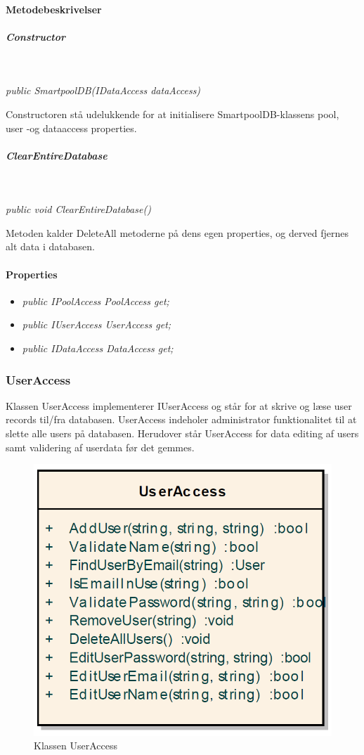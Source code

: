 \paragraph{Metodebeskrivelser}

\subparagraph{Constructor}\

\textit{public SmartpoolDB(IDataAccess dataAccess)}

Constructoren stå udelukkende for at initialisere SmartpoolDB-klassens pool, user -og dataaccess properties.

\subparagraph{ClearEntireDatabase}\

\textit{public void ClearEntireDatabase()}

Metoden kalder DeleteAll metoderne på dens egen properties, og derved fjernes alt data i databasen.

\paragraph{Properties}

\begin{itemize}
	\item \textit{public IPoolAccess PoolAccess { get; }}
	\item \textit{public IUserAccess UserAccess { get; }}
	\item \textit{public IDataAccess DataAccess { get; }}
\end{itemize}

\subsubsection{UserAccess}
Klassen UserAccess implementerer IUserAccess og står for at skrive og læse user records til/fra databasen.
UserAccess indeholer administrator funktionalitet til at slette alle users på databasen. Herudover står UserAccess for data editing af users samt validering af userdata før det gemmes. 

\begin{figure}
\centering
\includegraphics[width=0.5\linewidth]{figs/implementering/UserAccessClass.PNG}
\caption{Klassen UserAccess}
\label{fig:UserAccessClass}
\end{figure}


